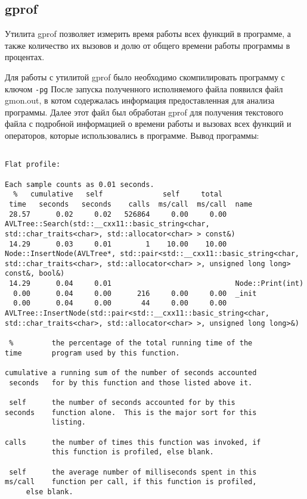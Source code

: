 \documentclass[12pt]{article}
\begin{document}
\subsection*{gprof}

Утилита gprof позволяет измерить время работы всех функций в программе, 
а также количество их вызовов и долю от общего времени работы программы в процентах.

Для работы с утилитой gprof было необходимо скомпилировать программу с ключом \texttt{-pg}
После запуска полученного исполняемого файла появился файл gmon.out, в котом содержалась информация
предоставленная для анализа программы. Далее этот файл был обработан gprof для получения текстового
файла с подробной информацией о времени работы и вызовах всех функций и операторов,
которые использовались в программе.
Вывод программы:
\begin{lstlisting}

Flat profile:

Each sample counts as 0.01 seconds.
  %   cumulative   self              self     total           
 time   seconds   seconds    calls  ms/call  ms/call  name    
 28.57      0.02     0.02   526864     0.00     0.00  AVLTree::Search(std::__cxx11::basic_string<char, std::char_traits<char>, std::allocator<char> > const&)
 14.29      0.03     0.01        1    10.00    10.00  Node::InsertNode(AVLTree*, std::pair<std::__cxx11::basic_string<char, std::char_traits<char>, std::allocator<char> >, unsigned long long> const&, bool&)
 14.29      0.04     0.01                             Node::Print(int)
  0.00      0.04     0.00      216     0.00     0.00  _init
  0.00      0.04     0.00       44     0.00     0.00  AVLTree::InsertNode(std::pair<std::__cxx11::basic_string<char, std::char_traits<char>, std::allocator<char> >, unsigned long long>&)

 %         the percentage of the total running time of the
time       program used by this function.

cumulative a running sum of the number of seconds accounted
 seconds   for by this function and those listed above it.

 self      the number of seconds accounted for by this
seconds    function alone.  This is the major sort for this
           listing.

calls      the number of times this function was invoked, if
           this function is profiled, else blank.

 self      the average number of milliseconds spent in this
ms/call    function per call, if this function is profiled,
     else blank.


\end{lstlisting}
\end{document}
